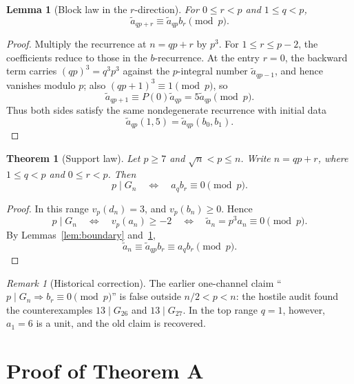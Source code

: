 \documentclass[11pt]{amsart}
\theoremstyle{plain}
\newtheorem{theorem}{Theorem}
\newtheorem{lemma}{Lemma}
\theoremstyle{remark}
\newtheorem{remark}{Remark}
\begin{document}
\begin{lemma}[Block law in the $r$-direction]\label{lem:block-law}
For $0\leq r<p$ and $1\leq q<p$,
\[
 \widetilde a_{qp+r}\equiv\widetilde a_{qp}b_r\pmod p.
\]
\end{lemma}

\begin{proof}
Multiply the recurrence at $n=qp+r$ by $p^3$.  For
$1\leq r\leq p-2$, the coefficients reduce to those in the
$b$-recurrence.  At the entry $r=0$, the backward term carries
$(qp)^3=q^3p^3$ against the $p$-integral number
$\widetilde a_{qp-1}$, and hence vanishes modulo $p$; also
$(qp+1)^3\equiv1\pmod p$, so
\[
 \widetilde a_{qp+1}\equiv P(0)\widetilde a_{qp}
 =5\widetilde a_{qp}\pmod p.
\]
Thus both sides satisfy the same nondegenerate recurrence with initial
data
\[
 \widetilde a_{qp}(1,5)=\widetilde a_{qp}(b_0,b_1).
\]
\end{proof}

\begin{theorem}[Support law]\label{thm:support-law}
Let $p\geq7$ and $\sqrt n<p\leq n$.  Write $n=qp+r$, where
$1\leq q<p$ and $0\leq r<p$.  Then
\[
 p\mid G_n
 \quad\Longleftrightarrow\quad
 a_qb_r\equiv0\pmod p.
\]
\end{theorem}

\begin{proof}
In this range $v_p(d_n)=3$, and $v_p(b_n)\geq0$.  Hence
\[
 p\mid G_n
 \quad\Longleftrightarrow\quad
 v_p(a_n)\geq-2
 \quad\Longleftrightarrow\quad
 \widetilde a_n=p^3a_n\equiv0\pmod p.
\]
By Lemmas~\ref{lem:boundary} and~\ref{lem:block-law},
\[
 \widetilde a_n
 \equiv\widetilde a_{qp}b_r
 \equiv a_qb_r\pmod p.
\]
\end{proof}

\begin{remark}[Historical correction]
The earlier one-channel claim
``$p\mid G_n\Rightarrow b_r\equiv0\pmod p$'' is false outside
$n/2<p<n$: the hostile audit found the counterexamples
$13\mid G_{26}$ and $13\mid G_{27}$.  In the top range $q=1$, however,
$a_1=6$ is a unit, and the old claim is recovered.
\end{remark}

\section{Proof of Theorem A}\label{sec:proof-density}
\end{document}
